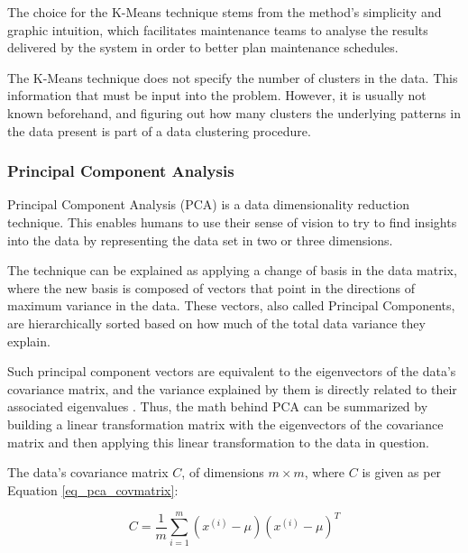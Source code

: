\documentclass[conference]{IEEEtran}
\begin{document}
The choice for the K-Means technique stems from the method's simplicity and graphic intuition, which facilitates maintenance teams to analyse the results delivered by the system in order to better plan maintenance schedules. 


The K-Means technique does not specify the number of clusters in the data. This information that must be input into the problem. However, it is usually not known beforehand, and figuring out how many clusters the underlying patterns in the data present is part of a data clustering procedure. %

\subsubsection{Principal Component Analysis}

Principal Component Analysis (PCA) is a data dimensionality reduction technique. This enables humans to use their sense of vision to try to find insights into the data by representing the data set in two or three dimensions.

The technique can be explained as applying a change of basis in the data matrix, where the new basis is composed of vectors that point in the directions of maximum variance in the data. These vectors, also called Principal Components, are hierarchically sorted based on how much of the total data variance they explain.

Such principal component vectors are equivalent to the eigenvectors of the data's covariance matrix, and the variance explained by them is directly related to their associated eigenvalues \cite{b7}. Thus, the math behind PCA can be summarized by building a linear transformation matrix with the eigenvectors of the covariance matrix and then applying this linear transformation to the data in question.

The data's covariance matrix $C$, of dimensions $m \times m$, where $C$ is given as per Equation \ref{eq_pca_covmatrix}:

\begin{equation}
	\label{eq_pca_covmatrix}
	C=\frac{1}{m}\sum_{i = 1}^{m}(x^{(i)}-\mu)(x^{(i)}-\mu)^{T}   
\end{equation}
\end{document}
